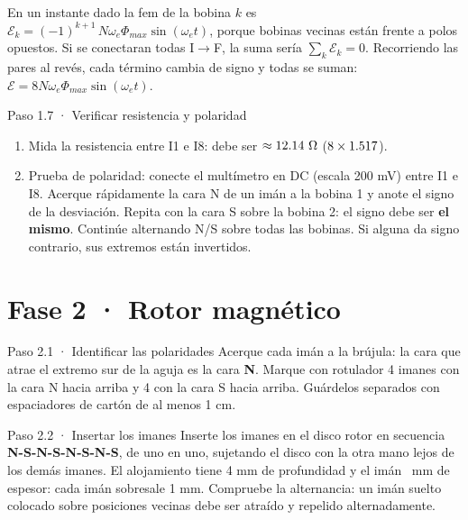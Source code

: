 \documentclass[11pt]{article}
\begin{document}
\begin{nota}
En un instante dado la fem de la bobina $k$ es $\mathcal{E}_k=(-1)^{k+1}\,N\omega_e\Phi_{max}\sin(\omega_e t)$, porque
bobinas vecinas están frente a polos opuestos. Si se conectaran todas I$\to$F, la suma sería
$\sum_k\mathcal{E}_k=0$. Recorriendo las pares al revés, cada término cambia de signo y todas se suman:
$\mathcal{E}=8N\omega_e\Phi_{max}\sin(\omega_e t)$.
\end{nota}

\begin{paso}{Paso 1.7 · Verificar resistencia y polaridad}
\begin{enumerate}
  \item Mida la resistencia entre I1 e I8: debe ser $\approx12.14\ \Omega$ ($8\times1.517$).
  \item Prueba de polaridad: conecte el multímetro en DC (escala 200 mV) entre I1 e I8. Acerque rápidamente la
        cara N de un imán a la bobina 1 y anote el signo de la desviación. Repita con la cara S sobre la bobina 2:
        el signo debe ser \textbf{el mismo}. Continúe alternando N/S sobre todas las bobinas. Si alguna da signo
        contrario, sus extremos están invertidos.
\end{enumerate}
\end{paso}

\section{Fase 2 · Rotor magnético}
\begin{paso}{Paso 2.1 · Identificar las polaridades}
Acerque cada imán a la brújula: la cara que atrae el extremo sur de la aguja es la cara \textbf{N}. Marque con
rotulador 4 imanes con la cara N hacia arriba y 4 con la cara S hacia arriba. Guárdelos separados con
espaciadores de cartón de al menos 1 cm.
\end{paso}

\begin{paso}{Paso 2.2 · Insertar los imanes}
Inserte los imanes en el disco rotor en secuencia \textbf{N-S-N-S-N-S-N-S}, de uno en uno, sujetando el disco con
la otra mano lejos de los demás imanes. El alojamiento tiene 4 mm de profundidad y el imán \ValEspesorIman\ mm de
espesor: cada imán sobresale 1 mm. Compruebe la alternancia: un imán suelto colocado sobre posiciones vecinas
debe ser atraído y repelido alternadamente.
\end{paso}
\end{document}
